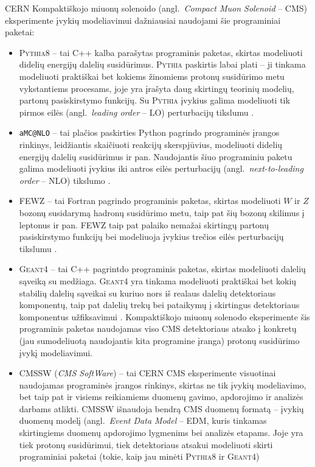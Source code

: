 \documentclass[a4paper, 12pt]{article}
\newcommand{\ttt}[1]{\texttt{#1}}
\begin{document}
CERN Kompaktiškojo miuonų solenoido (angl.\ \textit{Compact Muon Solenoid} -- CMS) eksperimente
įvykių modeliavimui dažniausiai naudojami šie programiniai paketai:
\begin{itemize}
	\item \textsc{Pythia8} -- tai C++ kalba parašytas programinis paketas, skirtas modeliuoti
	didelių energijų dalelių susidūrimus.
	\textsc{Pythia} paskirtis labai plati -- ji tinkama modeliuoti praktiškai bet kokiems žinomiems protonų
	susidūrimo metu vykstantiems procesams, joje yra įrašyta daug skirtingų teorinių modelių,
	partonų pasiskirstymo funkcijų.
	Su \textsc{Pythia} įvykius galima modeliuoti tik pirmos eilės (angl.\ \textit{leading order} -- LO)
	perturbacijų tikslumu \cite{pythia82}.
	
	\item \ttt{aMC@NLO} -- tai plačios paskirties Python pagrindo programinės įrangos rinkinys,
	leidžiantis skaičiuoti reakcijų skerspjūvius, modeliuoti didelių energijų dalelių susidūrimus ir pan.
	Naudojantis šiuo programiniu paketu galima modeliuoti įvykius iki antros eilės perturbacijų
	(angl.\ \textit{next-to-leading order} -- NLO) tikslumo \cite{amcatnlo}.
	
	\item FEWZ -- tai Fortran pagrindo programinis paketas, skirtas modeliuoti  $W$ ir $Z$
	bozonų susidarymą hadronų susidūrimo metu, taip pat šių bozonų skilimus į leptonus ir pan.
	FEWZ taip pat palaiko nemažai skirtingų partonų pasiskirstymo funkcijų bei modeliuoja įvykius
	trečios eilės perturbacijų tikslumu \cite{fewz}.
	
	\item \textsc{Geant4} -- tai C++ pagrintdo programinis paketas, skirtas modeliuoti dalelių sąveiką
	su medžiaga.
	\textsc{Geant4} yra tinkama modeliuoti praktiškai bet kokių stabilių dalelių sąveikai su kuriuo nors iš
	realaus dalelių detektoriaus komponentų, taip pat dalelių trekų bei pataikymų į skirtingus detektoriaus
	komponentus užfiksavimui \cite{geant4}.
	Kompaktiškojo miuonų solenodo eksperimente šis programinis paketas naudojamas viso CMS detektoriaus
	atsako į konkretų (jau sumodeliuotą naudojantis kita programine įranga) protonų susidūrimo įvykį
	modeliavimui.
	
	\item CMSSW (\textit{CMS SoftWare}) -- tai CERN CMS eksperimente visuotinai naudojamas programinės
	įrangos rinkinys, skirtas ne tik įvykių modeliavimo, bet taip pat ir  visiems reikiamiems duomenų
	gavimo, apdorojimo ir analizės darbams atlikti.
	CMSSW išnaudoja bendrą CMS duomenų formatą -- įvykių duomenų modelį (angl.\ \textit{Event Data Model}
	-- EDM, kuris tinkamas skirtingiems duomenų apdorojimo lygmenims bei analizės etapams.
	Joje yra tiek protonų susidūrimui, tiek detektoriaus atsakui modeliuoti skirti programiniai paketai
	(tokie, kaip jau minėti \textsc{Pythia8} ir \textsc{Geant4})
\end{itemize}
\end{document}
